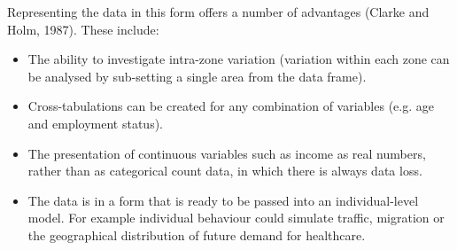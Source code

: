 \documentclass[a4paper,10pt]{article}
\begin{document}
Representing the data in this form offers a number of advantages
(Clarke and Holm, 1987). These include:
\begin{itemize}
 \item The ability to investigate intra-zone variation (variation within each zone can be analysed
 by sub-setting a single area from the data frame).
\item Cross-tabulations can be created for any combination of variables (e.g. age and employment status).
\item The presentation of continuous variables such as income as real numbers, 
rather than as categorical count data, in which there is always data loss.
\item The data is in a form that is ready to be passed into an individual-level model.
For example individual behaviour could simulate traffic, migration or the geographical distribution of future demand for healthcare.
\end{itemize}

\end{document}

